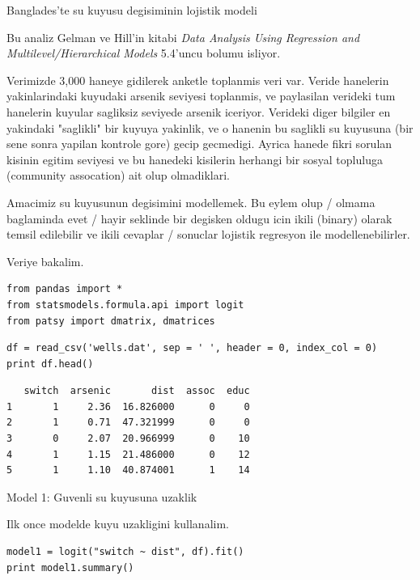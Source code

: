 \documentclass[12pt,fleqn]{article}\usepackage{../common}
\begin{document}
Banglades'te su kuyusu degisiminin lojistik modeli

Bu analiz Gelman ve Hill'in kitabi {\em Data Analysis Using Regression and
Multilevel/Hierarchical Models} 5.4'uncu bolumu isliyor.

Verimizde 3,000 haneye gidilerek anketle toplanmis veri var. Veride
hanelerin yakinlarindaki kuyudaki arsenik seviyesi toplanmis, ve
paylasilan verideki tum hanelerin kuyular sagliksiz seviyede arsenik
iceriyor. Verideki diger bilgiler en yakindaki "saglikli" bir kuyuya
yakinlik, ve o hanenin bu saglikli su kuyusuna (bir sene sonra yapilan
kontrole gore) gecip gecmedigi.  Ayrica hanede fikri sorulan kisinin
egitim seviyesi ve bu hanedeki kisilerin herhangi bir sosyal topluluga
(community assocation) ait olup olmadiklari.

Amacimiz su kuyusunun degisimini modellemek. Bu eylem olup / olmama baglaminda
evet / hayir seklinde bir degisken oldugu icin ikili (binary) olarak
temsil edilebilir ve ikili cevaplar / sonuclar lojistik regresyon ile
modellenebilirler.

Veriye bakalim.

\begin{verbatim}
from pandas import *
from statsmodels.formula.api import logit
from patsy import dmatrix, dmatrices
\end{verbatim}

\begin{verbatim}
df = read_csv('wells.dat', sep = ' ', header = 0, index_col = 0)
print df.head()
\end{verbatim}

\begin{verbatim}
   switch  arsenic       dist  assoc  educ
1       1     2.36  16.826000      0     0
2       1     0.71  47.321999      0     0
3       0     2.07  20.966999      0    10
4       1     1.15  21.486000      0    12
5       1     1.10  40.874001      1    14
\end{verbatim}

Model 1: Guvenli su kuyusuna uzaklik

Ilk once modelde kuyu uzakligini kullanalim. 

\begin{verbatim}
model1 = logit("switch ~ dist", df).fit()
print model1.summary()
\end{verbatim}
\end{document}
